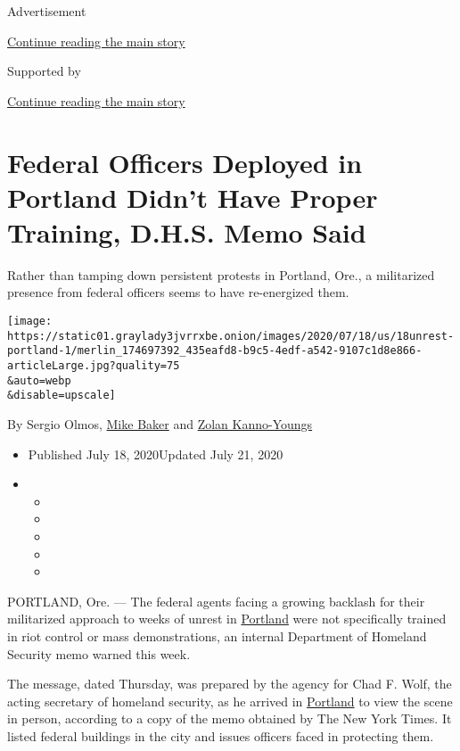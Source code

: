 Advertisement

\protect\hyperlink{after-top}{Continue reading the main story}

Supported by

\protect\hyperlink{after-sponsor}{Continue reading the main story}

\hypertarget{federal-officers-deployed-in-portland-didnt-have-proper-training-dhs-memo-said}{%
\section{Federal Officers Deployed in Portland Didn't Have Proper
Training, D.H.S. Memo
Said}\label{federal-officers-deployed-in-portland-didnt-have-proper-training-dhs-memo-said}}

Rather than tamping down persistent protests in Portland, Ore., a
militarized presence from federal officers seems to have re-energized
them.

\texttt{[image: https://static01.graylady3jvrrxbe.onion/images/2020/07/18/us/18unrest-portland-1/merlin\_174697392\_435eafd8-b9c5-4edf-a542-9107c1d8e866-articleLarge.jpg?quality=75\\\&auto=webp\\\&disable=upscale]}

By Sergio Olmos,
\href{https://www.nytimes3xbfgragh.onion/by/mike-baker}{Mike Baker} and
\href{https://www.nytimes3xbfgragh.onion/by/zolan-kanno-youngs}{Zolan
Kanno-Youngs}

\begin{itemize}
\item
  Published July 18, 2020Updated July 21, 2020
\item
  \begin{itemize}
  \item
  \item
  \item
  \item
  \item
  \end{itemize}
\end{itemize}

PORTLAND, Ore. --- The federal agents facing a growing backlash for
their militarized approach to weeks of unrest in
\href{https://www.nytimes3xbfgragh.onion/2020/07/21/us/portland-protests.html}{Portland}
were not specifically trained in riot control or mass demonstrations, an
internal Department of Homeland Security memo warned this week.

The message, dated Thursday, was prepared by the agency for Chad F.
Wolf, the acting secretary of homeland security, as he arrived in
\href{https://www.nytimes3xbfgragh.onion/2020/07/21/us/portland-protests.html}{Portland}
to view the scene in person, according to a copy of the memo obtained by
The New York Times. It listed federal buildings in the city and issues
officers faced in protecting them.


